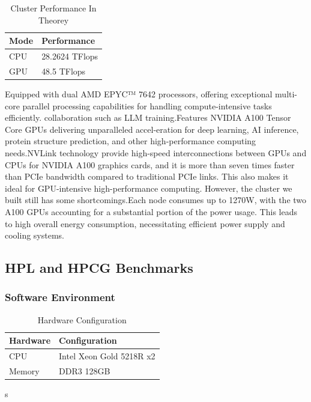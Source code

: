 \documentclass[a4paper,12pt]{article}
\begin{document}
\begin{table}[H]
\centering
\vspace{0.5cm}
\begin{tabular}{ll}
\toprule
Mode & Performance \\
\midrule
CPU & 28.2624 TFlops \\
GPU & 48.5 TFlops \\
\bottomrule
\end{tabular}
\caption{Cluster Performance In Theorey}
\end{table}

Equipped with dual AMD EPYC™ 7642 processors, offering exceptional multi-core parallel processing capabilities for handling compute-intensive tasks efficiently. collaboration such as LLM training.Features NVIDIA A100 Tensor Core GPUs delivering unparalleled accel-eration for deep learning, AI inference, protein structure prediction, and other high-performance computing needs.NVLink technology provide high-speed interconnections between GPUs and CPUs for NVIDIA A100 graphics cards, and it is more than seven times faster than PCIe bandwidth compared to traditional PCIe links. This also makes it ideal for GPU-intensive high-performance computing. However, the cluster we built still has some shortcomings.Each node consumes up to 1270W, with the two A100 GPUs accounting for a substantial portion of the power usage. This leads to high overall energy consumption, necessitating efficient power supply and cooling systems.

\subsection{HPL and HPCG Benchmarks}

\subsubsection{Software Environment}

\begin{table}[H]
\centering
\vspace{0.5cm}
\begin{tabular}{ll}
\toprule
Hardware & Configuration \\
\midrule
CPU & Intel Xeon Gold 5218R x2 \\
Memory & DDR3 128GB \\
\bottomrule
\end{tabular}
\caption{Hardware Configuration}s
\end{table}
\end{document}
